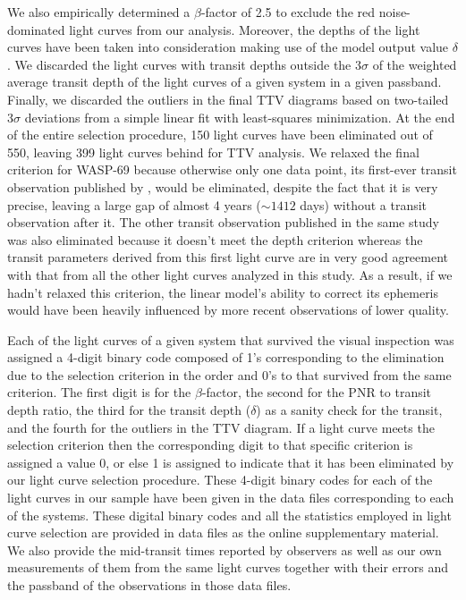 \documentclass[a4paper,fleqn,usenatbib]{mnras}
\begin{document}
We also empirically determined a $\beta$-factor of 2.5 to exclude the red noise-dominated light curves from our analysis. Moreover, the depths of the light curves have been taken into consideration making use of the model output value $\delta$. We discarded the light curves with transit depths outside the 3$\sigma$ of the weighted average transit depth of the light curves of a given system in a given passband. Finally, we discarded the outliers in the final TTV diagrams based on two-tailed 3$\sigma$ deviations from a simple linear fit with least-squares minimization. At the end of the entire selection procedure, 150 light curves have been eliminated out of 550, leaving 399 light curves behind for TTV analysis. We relaxed the final criterion for WASP-69 because otherwise only one data point, its first-ever transit observation published by \cite{2014MNRAS.445.1114A}, would be eliminated, despite the fact that it is very precise, leaving a large gap of almost 4 years ($\sim1412$ days) without a transit observation after it. The other transit observation published in the same study was also eliminated because it doesn't meet the depth criterion whereas the transit parameters derived from this first light curve are in very good agreement with that from all the other light curves analyzed in this study. As a result, if we hadn't relaxed this criterion, the linear model's ability to correct its ephemeris would have been heavily influenced by more recent observations of lower quality.

Each of the light curves of a given system that survived the visual inspection was assigned a 4-digit binary code composed of 1's corresponding to the elimination due to the selection criterion in the order and 0's to that survived from the same criterion. The first digit is for the $\beta$-factor, the second for the PNR to transit depth ratio, the third for the transit depth ($\delta$) as a sanity check for the transit, and the fourth for the outliers in the TTV diagram. If a light curve meets the selection criterion then the corresponding digit to that specific criterion is assigned a value 0, or else 1 is assigned to indicate that it has been eliminated by our light curve selection procedure. These 4-digit binary codes for each of the light curves in our sample have been given in the data files corresponding to each of the systems. These digital binary codes and all the statistics employed in light curve selection are provided in data files as the online supplementary material. We also provide the mid-transit times reported by observers as well as our own measurements of them from the same light curves together with their errors and the passband of the observations in those data files.
\end{document}
